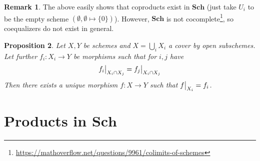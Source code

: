 \documentclass{scrartcl}
\newcommand{\Sch}{\mathrm{\textbf{Sch}}}
\newcommand\restr[2]{{
    \left.\kern-\nulldelimiterspace
    #1
    \vphantom{\big|}
    \right|_{#2}
}}
\newtheorem{prop}{Proposition}[section]
\theoremstyle{definition}
\newtheorem{remark}[prop]{Remark}
\begin{document}
\begin{remark}
    The above easily shows that coproducts exist in $\Sch$ (just take $U_i$ to be the empty scheme $(\emptyset, \emptyset \mapsto \{0\})$).
    However, $\Sch$ is not cocomplete\footnote{\href{https://mathoverflow.net/questions/9961/colimits-of-schemes}{https://mathoverflow.net/questions/9961/colimits-of-schemes}}, so coequalizers do not exist in general.
\end{remark}
\begin{prop}
    Let $X, Y$ be schemes and $X = \bigcup_i X_i$ a cover by open subschemes.
    Let further $f_i: X_i \to Y$ be morphisms such that for $i, j$ have
    \begin{equation*}
        \restr{f_i}{X_i \cap X_j} = \restr{f_j}{X_i \cap X_j}
    \end{equation*}
    Then there exists a unique morphism $f: X \to Y$ such that $\restr{f}{X_i} = f_i$.
\end{prop}

\section{Products in $\Sch$}
\end{document}
